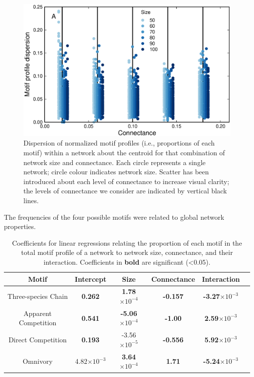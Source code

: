 \documentclass[12pt]{article}
\begin{document}
\begin{spacing}{2.0}
   \begin{figure}[h!]
       \centering
       \includegraphics[width=.75\textwidth]{figures/proportion_profile_dispersion.eps}
       \caption{Dispersion of normalized motif profiles (i.e., proportions of each motif) within a network about the centroid for that combination of network size and connectance. Each circle represents a single network; circle colour indicates network size. Scatter has been introduced about each level of connectance to increase visual clarity; the levels of connectance we consider are indicated by vertical black lines.}
       \label{dispersion_normmotifs}
    \end{figure}


    The frequencies of the four possible motifs were related to global network properties.

    \begin{table}[hb!]
        \centering
        \caption{Coefficients for linear regressions relating the proportion of each motif in the total motif profile of a network to network size, connectance, and their interaction. Coefficients in \textbf{bold} are significant (\textless0.05).}
       \label{network_prop_lms}
       \begin{tabular}{c|c c c c c}
            Motif & Intercept & Size & Connectance & Interaction \\
            \hline
            Three-species Chain & \textbf{0.262} & \textbf{1.78$\times10^{-4}$} & \textbf{-0.157} & \textbf{-3.27$\times10^{-3}$} \\
            Apparent Competition & \textbf{0.541} & \textbf{-5.06$\times10^{-4}$} & \textbf{-1.00} & \textbf{2.59$\times10^{-3}$} \\
            Direct Competition & \textbf{0.193} & -3.56$\times10^{-5}$ & \textbf{-0.556} & \textbf{5.92$\times10^{-3}$} \\
            Omnivory & 4.82$\times10^{-3}$ & \textbf{3.64$\times10^{-4}$} & \textbf{1.71} & \textbf{-5.24$\times10^{-3}$}\\
            \hline
            \end{tabular}
    \end{table}        
\clearpage
    


\end{spacing}
\end{document}
